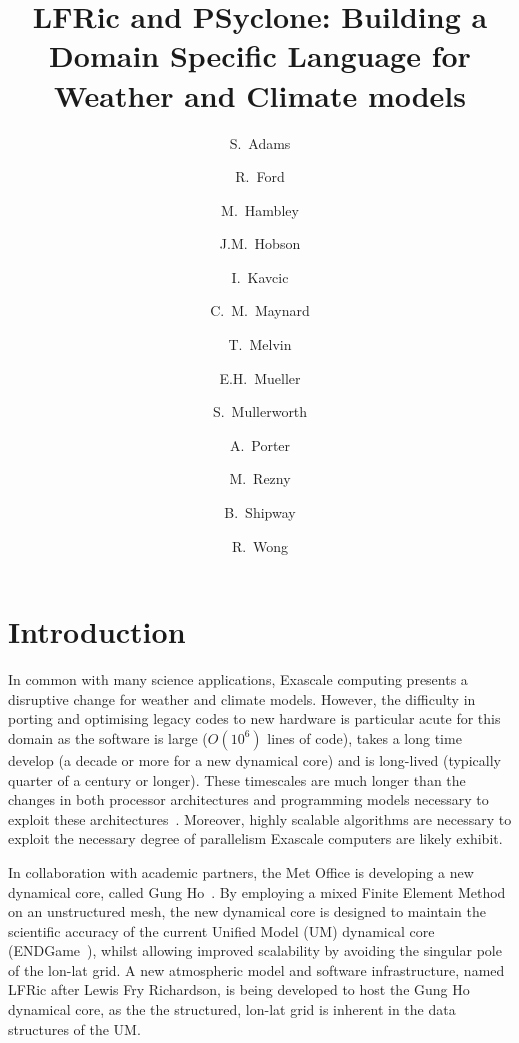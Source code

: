 \documentclass[times]{elsarticle}
\begin{document}
\begin{frontmatter}

\title{LFRic and PSyclone: Building a Domain Specific Language for Weather and Climate models}

\author[met]{S.~Adams}
\author[hartree]{R.~Ford}
\author[met]{M.~Hambley}
\author[met]{J.M.~Hobson}
\author[met]{I.~Kavcic}
\author[met,read]{C.~M.~Maynard}
\author[met]{T.~Melvin}
\author[bath]{E.H.~Mueller}
\author[met]{S.~Mullerworth}
\author[hartree]{A.~Porter}
\author[downunder]{M.~Rezny}
\author[met]{B.~Shipway}
\author[met]{R.~Wong}




\address[met]{Met Office, FitzRoy Road, Exeter, EX1 3PB}
\address[hartree]{Hartree Centre, STFC Daresbury, Grim up North}
\address[read]{Department of Computer Science, Polly Vacher Building,
  University of Reading, Reading, UK, RG6 6AY}
\address[bath]{Department of Mathematics, University of Bath, Bath}
\address[downunder]{Monash University, Melbourne, Australia}

\begin{abstract}
\end{abstract}

\begin{keyword}

\end{keyword}

\end{frontmatter}

\section{Introduction}
In common with many science applications, Exascale computing presents
a disruptive change for weather and climate models. However, the
difficulty in porting and optimising legacy codes to new hardware is
particular acute for this domain as the software is large ($O(10^6)$
lines of code), takes a long time develop (a decade or more for a new
dynamical core) and is long-lived (typically quarter of a century or longer). These
timescales are much longer than the changes in both processor
architectures and programming models necessary to exploit these
architectures~\cite{gmd-2017-186}. Moreover, highly scalable
algorithms are necessary to exploit the necessary degree of
parallelism Exascale computers are likely exhibit.

In collaboration with academic partners, the Met Office is developing
a new dynamical core, called Gung Ho~\cite{MELVIN2018342}. By
employing a mixed Finite Element Method on an unstructured mesh, the
new dynamical core is designed to maintain the scientific accuracy of
the current Unified Model (UM) dynamical core (ENDGame~\cite{QJ:QJ2235}),
whilst allowing improved scalability by avoiding the singular pole of
the lon-lat grid. A new atmospheric model and software infrastructure,
named LFRic after Lewis Fry Richardson, is being developed to host the
Gung Ho dynamical core, as the the structured, lon-lat grid is inherent in the
data structures of the UM.
\end{document}
